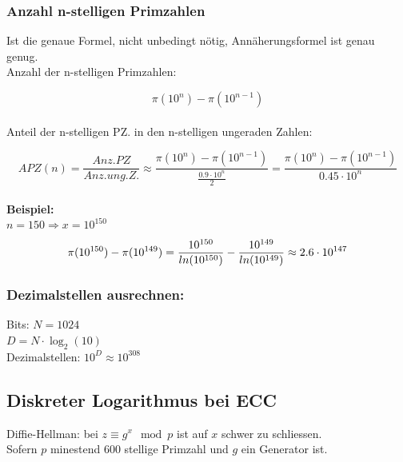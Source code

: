 \documentclass[12pt]{scrartcl}
\begin{document}
\subsubsection{Anzahl n-stelligen Primzahlen}

Ist die genaue Formel, nicht unbedingt nötig, Annäherungsformel ist genau genug.\\

Anzahl der n-stelligen Primzahlen:

\[ \pi(10^n) - \pi(10^{n-1})  \] \\

Anteil der n-stelligen PZ. in den n-stelligen ungeraden Zahlen:

\begin{equation*}
    APZ(n) = \frac{Anz. PZ}{Anz.ung.Z.} \approx \frac{\pi(10^n) - \pi(10^{n-1})}{\displaystyle{\frac{0.9 \cdot 10^n}{2}}} = \frac{\pi(10^n) - \pi(10^{n-1})}{0.45 \cdot 10^n}
\end{equation*} \\


\textbf{Beispiel:} \\
$n = 150 \Rightarrow x = 10^{150}$ \\

\begin{equation*}
    \pi(10^{150}) - \pi(10^{149}) = \frac{10^{150}}{ln(10^{150})} - \frac{10^{149}}{ln(10^{149})} \approx 2.6 \cdot 10^{147} \\
\end{equation*}


\subsubsection{Dezimalstellen ausrechnen:}

Bits: $N = 1024$\\
$D = N \cdot \log_2(10)$\\
Dezimalstellen: $10^{D} \approx 10^{308}$\\





\subsection{Diskreter Logarithmus bei ECC}

Diffie-Hellman: bei $z \equiv g^x \mod p$ ist auf $x$ schwer zu schliessen.\\
Sofern $p$ minestend 600 stellige Primzahl und $g$ ein Generator ist.\\
\end{document}

